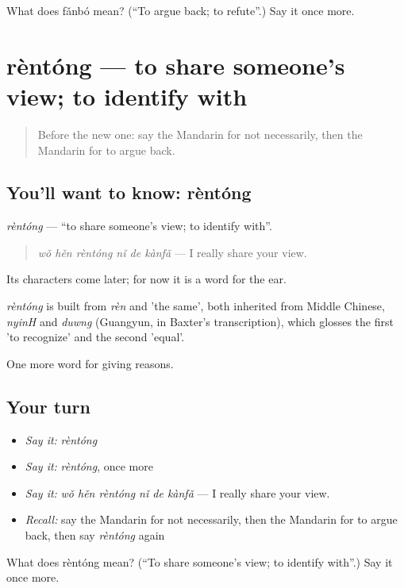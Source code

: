 \begin{tcolorbox}[breakable,colback=teal!4,colframe=teal!35!black,title={Before you move on}]
What does fǎnbó mean? (\textquotedblleft{}To argue back; to refute\textquotedblright{}.) Say it once more.
\end{tcolorbox}
\section[rèntóng]{rèntóng — to share someone's view; to identify with}

\label{lesson:ZH-C353-rentong}



\begin{quote}
Before the new one: say the Mandarin for not necessarily, then the Mandarin for to argue back.
\end{quote}

\subsection*{You'll want to know: rèntóng}
\emph{rèntóng} — \textquotedblleft{}to share someone's view; to identify with\textquotedblright{}.

\begin{quote}
\emph{wǒ hěn rèntóng nǐ de kànfǎ} — I really share your view.
\end{quote}

Its characters come later; for now it is a word for the ear.

\begin{cousinweb}
\emph{rèntóng} is built from \emph{rèn} and  'the same', both inherited from Middle Chinese, \emph{nyinH} and \emph{duwng} (Guangyun, in Baxter's transcription), which glosses the first 'to recognize' and the second 'equal'.
\end{cousinweb}

\begin{grammarlens}[title={What you've built}]
One more word for giving reasons.
\end{grammarlens}

\subsection*{Your turn}
\begin{itemize}
\raggedright
  \item \emph{Say it:} \emph{rèntóng}
  \item \emph{Say it:} \emph{rèntóng}, once more
  \item \emph{Say it:} \emph{wǒ hěn rèntóng nǐ de kànfǎ} — I really share your view.
  \item \emph{Recall:} say the Mandarin for not necessarily, then the Mandarin for to argue back, then say \emph{rèntóng} again
\end{itemize}

\begin{tcolorbox}[breakable,colback=teal!4,colframe=teal!35!black,title={Before you move on}]
What does rèntóng mean? (\textquotedblleft{}To share someone's view; to identify with\textquotedblright{}.) Say it once more.
\end{tcolorbox}

